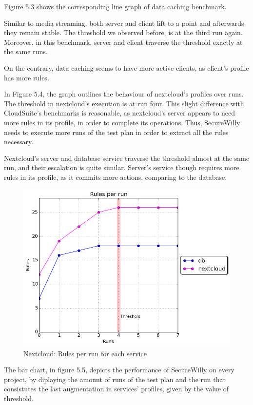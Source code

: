 Figure 5.3 shows the corresponding line graph of data caching benchmark.

Similar to media streaming, both server and client lift to a point and afterwards they remain stable. The threshold we observed before, is at the third run again. Moreover, in this benchmark, server and client traverse the threshold exactly at the same runs.

On the contrary, data caching seems to have more active clients, as client's profile has more rules.

In Figure 5.4, the graph outlines the behaviour of nextcloud's profiles over runs. The threshold in nextcloud's execution is at run four. This slight difference with CloudSuite's benchmarks is reasonable, as nextcloud's server appears to need more rules in its profile, in order to complete its operations. Thus, SecureWilly needs to execute more runs of the test plan in order to extract all the rules necessary.

Nextcloud's server and database service traverse the threshold almost at the same run, and their escalation is quite similar. Server's service though requires more rules in its profile, as it commits more actions, comparing to the database.

\begin{figure}[h!]
  \centering
   \includegraphics[width=0.75\linewidth]{../figures/nextcloud/rulesthreshold.png}
   \caption{Nextcloud: Rules per run for each service}
\end{figure}
\hfill\break

The bar chart, in figure 5.5, depicts the performance of SecureWilly on every project, by diplaying the amount of runs of the test plan and the run that consistutes the last augmentation in services' profiles, given by the value of threshold.

